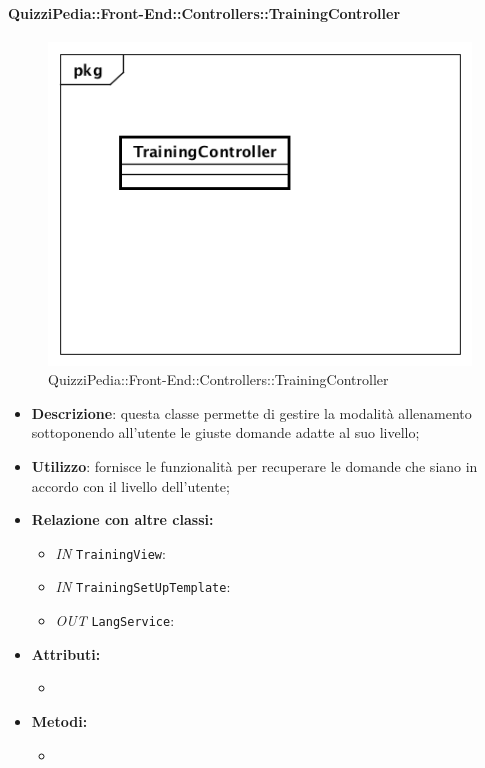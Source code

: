\paragraph{QuizziPedia::Front-End::Controllers::TrainingController}
\begin{figure}
	\centering
	\includegraphics[scale=0.45]{UML/Classi/Front-End/QuizziPedia_Front-end_Controller_TrainingController.png}
	\caption{QuizziPedia::Front-End::Controllers::TrainingController}
\end{figure}
\begin{itemize}
	\item \textbf{Descrizione}: questa classe permette di gestire la modalità allenamento sottoponendo all'utente le giuste domande adatte al suo livello;
	\item \textbf{Utilizzo}: fornisce le funzionalità per recuperare le domande che siano in accordo con il livello dell'utente;
	\item \textbf{Relazione con altre classi:}
	\begin{itemize}
		\item \textit{IN} \texttt{TrainingView}: 
		\item \textit{IN} \texttt{TrainingSetUpTemplate}:
		\item \textit{OUT} \texttt{LangService}:  
	\end{itemize}
	\item \textbf{Attributi:}
	\begin{itemize}
		\item 
	\end{itemize}
	\item \textbf{Metodi:}
	\begin{itemize}
		\item 
	\end{itemize}
\end{itemize}

